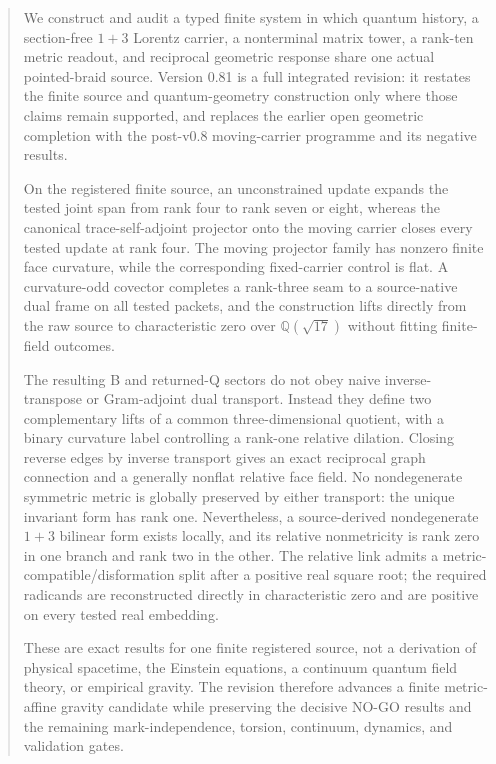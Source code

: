 \documentclass[12pt,a4paper,twoside]{article}
\begin{document}
\begin{abstract}
We construct and audit a typed finite system in which quantum history, a section-free $1+3$ Lorentz carrier, a nonterminal matrix tower, a rank-ten metric readout, and reciprocal geometric response share one actual pointed-braid source. Version 0.81 is a full integrated revision: it restates the finite source and quantum-geometry construction only where those claims remain supported, and replaces the earlier open geometric completion with the post-v0.8 moving-carrier programme and its negative results.

On the registered finite source, an unconstrained update expands the tested joint span from rank four to rank seven or eight, whereas the canonical trace-self-adjoint projector onto the moving carrier closes every tested update at rank four. The moving projector family has nonzero finite face curvature, while the corresponding fixed-carrier control is flat. A curvature-odd covector completes a rank-three seam to a source-native dual frame on all tested packets, and the construction lifts directly from the raw source to characteristic zero over $\mathbb{Q}(\sqrt{17})$ without fitting finite-field outcomes.

The resulting B and returned-Q sectors do not obey naive inverse-transpose or Gram-adjoint dual transport. Instead they define two complementary lifts of a common three-dimensional quotient, with a binary curvature label controlling a rank-one relative dilation. Closing reverse edges by inverse transport gives an exact reciprocal graph connection and a generally nonflat relative face field. No nondegenerate symmetric metric is globally preserved by either transport: the unique invariant form has rank one. Nevertheless, a source-derived nondegenerate $1+3$ bilinear form exists locally, and its relative nonmetricity is rank zero in one branch and rank two in the other. The relative link admits a metric-compatible/disformation split after a positive real square root; the required radicands are reconstructed directly in characteristic zero and are positive on every tested real embedding.

These are exact results for one finite registered source, not a derivation of physical spacetime, the Einstein equations, a continuum quantum field theory, or empirical gravity. The revision therefore advances a finite metric-affine gravity candidate while preserving the decisive NO-GO results and the remaining mark-independence, torsion, continuum, dynamics, and validation gates.
\end{abstract}
\end{document}
